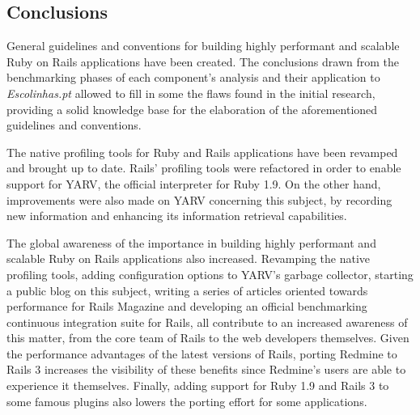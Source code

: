 \documentclass[9pt,a4paper]{extarticle}
\begin{document}
\begin{multicols}{2}
\section{Conclusions}
General guidelines and conventions for building highly performant and scalable Ruby on Rails applications have been created. The conclusions drawn from the benchmarking phases of each component's analysis and their application to \textit{Escolinhas.pt} allowed to fill in some the flaws found in the initial research, providing a solid knowledge base for the elaboration of the aforementioned guidelines and conventions.

The native profiling tools for Ruby and Rails applications have been revamped and brought up to date. Rails' profiling tools were refactored in order to enable support for YARV, the official interpreter for Ruby 1.9. On the other hand, improvements were also made on YARV concerning this subject, by recording new information and enhancing its information retrieval capabilities.

The global awareness of the importance in building highly performant and scalable Ruby on Rails applications also increased. Revamping the native profiling tools, adding configuration options to YARV's garbage collector, starting a public blog on this subject, writing a series of articles oriented towards performance for Rails Magazine and developing an official benchmarking continuous integration suite for Rails, all contribute to an increased awareness of this matter, from the core team of Rails to the web developers themselves. Given the performance advantages of the latest versions of Rails, porting Redmine to Rails 3 increases the visibility of these benefits since Redmine's users are able to experience it themselves. Finally, adding support for Ruby 1.9 and Rails 3 to some famous plugins also lowers the porting effort for some applications.

%

\end{multicols}
\end{document}
